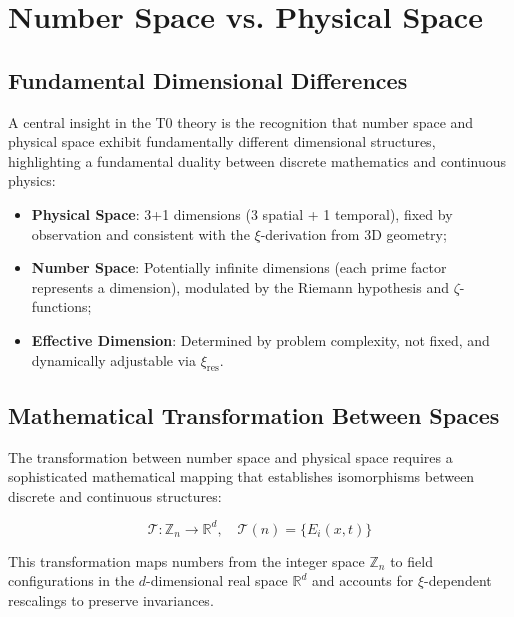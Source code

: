 	\section{Number Space vs. Physical Space}
	\label{sec:number_physical_space}
	
	\subsection{Fundamental Dimensional Differences}
	\label{subsec:dimensional_differences}
	
	A central insight in the T0 theory is the recognition that number space and physical space exhibit fundamentally different dimensional structures, highlighting a fundamental duality between discrete mathematics and continuous physics:
	
\begin{tcolorbox}[colback=yellow!10!white,colframe=yellow!50!black,title={Contrasting Dimensional Structures},width=\textwidth]
	\begin{itemize}
		\item \textbf{Physical Space}: 3+1 dimensions (3 spatial + 1 temporal), fixed by observation and consistent with the $\xi$-derivation from 3D geometry;
		\item \textbf{Number Space}: Potentially infinite dimensions (each prime factor represents a dimension), modulated by the Riemann hypothesis and $\zeta$-functions;
		\item \textbf{Effective Dimension}: Determined by problem complexity, not fixed, and dynamically adjustable via $\xi_{\text{res}}$.
	\end{itemize}
\end{tcolorbox}
	
	\subsection{Mathematical Transformation Between Spaces}
	\label{subsec:mathematical_transformation}
	
	The transformation between number space and physical space requires a sophisticated mathematical mapping that establishes isomorphisms between discrete and continuous structures:
	
	\begin{equation}
		\mathcal{T}: \mathbb{Z}_n \to \mathbb{R}^d, \quad \mathcal{T}(n) = \{E_i(x,t)\}
	\end{equation}
	
	This transformation maps numbers from the integer space $\mathbb{Z}_n$ to field configurations in the $d$-dimensional real space $\mathbb{R}^d$ and accounts for $\xi$-dependent rescalings to preserve invariances.
	
